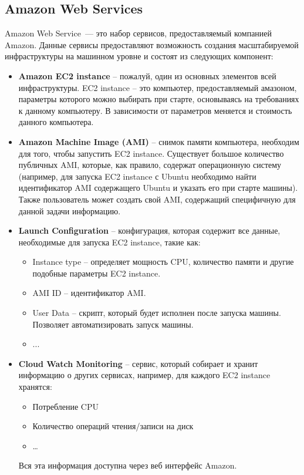 \subsection{Amazon Web Services}
	Amazon Web Service~--- это набор сервисов, предоставляемый компанией Amazon. Данные сервисы предоставляют возможность создания масштабируемой инфраструктуры на машинном уровне и состоят из следующих компонент:
\begin{itemize}
	\item \textbf{Amazon EC2 instance} -- пожалуй, один из основных элементов всей инфраструктуры. EC2 instance -- это компьютер, предоставляемый амазоном, параметры которого можно выбирать при старте, основываясь на требованиях к данному компьютеру. В зависимости от параметров меняется и стоимость данного компьютера.
	\item \textbf{Amazon Machine Image (AMI)} -- снимок памяти компьютера, необходим для того, чтобы запустить EC2 instance. Существует большое количество публичных AMI, которые, как правило, содержат операционную систему (например, для запуска EC2 instance с Ubuntu необходимо найти идентификатор AMI содержащего Ubuntu  и указать его при старте машины). Также пользователь может создать свой AMI, содержащий специфичную для данной задачи информацию.
	\item \textbf{Launch Configuration} -- конфигурация, которая содержит все данные, необходимые для запуска EC2 instance, такие как: 
	\begin{itemize}
		\item Instance type -- определяет мощность CPU, количество памяти и другие подобные параметры  EC2 instance.
		\item AMI ID -- идентификатор AMI.
		\item User Data -- скрипт, который будет исполнен после запуска машины. Позволяет автоматизировать запуск машины.
		\item ...
	\end{itemize}
	\item \textbf{Cloud Watch Monitoring} -- сервис, который собирает и хранит информацию о других сервисах, например, для каждого EC2 instance хранятся: 
	\begin{itemize}
		\item Потребление CPU
		\item Количество операций чтения/записи на диск
		\item \dots
	\end{itemize}
	Вся эта информация доступна через веб интерфейс Amazon. %

\end{itemize}
